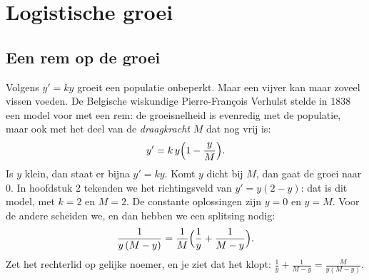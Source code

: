 
\begin{oefeningen}
\end{oefeningen}

\section{Logistische groei}

\subsection{Een rem op de groei}

Volgens $y' = ky$ groeit een populatie onbeperkt. Maar een vijver kan maar zoveel vissen voeden. De Belgische wiskundige Pierre-François Verhulst stelde in 1838 een model voor met een rem: de groeisnelheid is evenredig met de populatie, maar ook met het deel van de \textit{draagkracht} $M$ dat nog vrij is:
\[
y' = k\,y \Bigl(1 - \frac{y}{M}\Bigr) .
\]
Is $y$ klein, dan staat er bijna $y' = ky$. Komt $y$ dicht bij $M$, dan gaat de groei naar 0. In hoofdstuk 2 tekenden we het richtingsveld van $y' = y(2 - y)$: dat is dit model, met $k = 2$ en $M = 2$. De constante oplossingen zijn $y = 0$ en $y = M$. Voor de andere scheiden we, en dan hebben we een splitsing nodig:
\[
\frac{1}{y\,(M - y)} = \frac{1}{M} \Bigl(\frac1y + \frac{1}{M - y}\Bigr) .
\]
Zet het rechterlid op gelijke noemer, en je ziet dat het klopt: $\tfrac1y + \tfrac{1}{M - y} = \tfrac{M}{y(M - y)}$.

